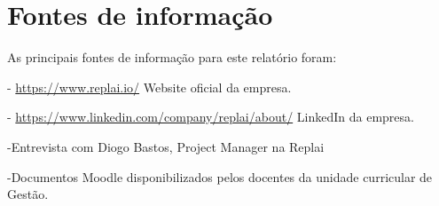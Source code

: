 \newpage


\section{Fontes de informação}
As principais fontes de informação para este relatório foram:


- \href{https://www.replai.io/}{https://www.replai.io/}  Website oficial da empresa. 

- \href{https://www.linkedin.com/company/replai/about/}{https://www.linkedin.com/company/replai/about/}  LinkedIn da empresa. 

-Entrevista com Diogo Bastos, Project Manager na Replai

-Documentos Moodle disponibilizados pelos docentes da unidade curricular de Gestão.